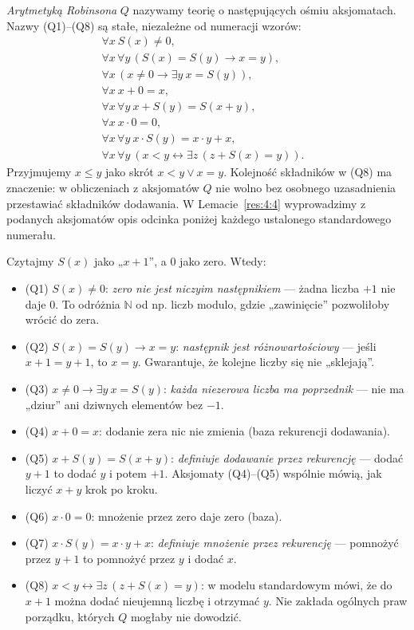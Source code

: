 \begin{definicja}\label{res:4:1}
\emph{Arytmetyką Robinsona} $Q$ nazywamy teorię o następujących ośmiu aksjomatach. Nazwy (Q1)--(Q8) są stałe, niezależne od numeracji wzorów:
\begin{align*}
\forall x\ S(x)\ne0, &\tag{Q1}\\
\forall x\,\forall y\,(S(x)=S(y)\to x=y), &\tag{Q2}\\
\forall x\,(x\ne0\to\exists y\ x=S(y)), &\tag{Q3}\\
\forall x\ x+0=x, &\tag{Q4}\\
\forall x\,\forall y\ x+S(y)=S(x+y), &\tag{Q5}\\
\forall x\ x\cdot0=0, &\tag{Q6}\\
\forall x\,\forall y\ x\cdot S(y)=x\cdot y+x, &\tag{Q7}\\
\forall x\,\forall y\ (x<y\leftrightarrow\exists z\,(z+S(x)=y)). &\tag{Q8}
\end{align*}
Przyjmujemy $x\le y$ jako skrót $x<y\lor x=y$. Kolejność składników w (Q8) ma znaczenie: w obliczeniach z aksjomatów $Q$ nie wolno bez osobnego uzasadnienia przestawiać składników dodawania. W Lemacie~\ref{res:4:4} wyprowadzimy z podanych aksjomatów opis odcinka poniżej każdego ustalonego standardowego numerału.
\end{definicja}

\begin{uwaga}\label{res:4:2}
Czytajmy $S(x)$ jako „$x+1$”, a $0$ jako zero. Wtedy:
\begin{itemize}
\item \textup{(Q1)} $S(x)\ne0$: \emph{zero nie jest niczyim następnikiem} --- żadna liczba $+1$ nie daje $0$. To odróżnia $\mathbb N$ od np. liczb modulo, gdzie „zawinięcie” pozwoliłoby wrócić do zera.
\item \textup{(Q2)} $S(x)=S(y)\to x=y$: \emph{następnik jest różnowartościowy} --- jeśli $x+1=y+1$, to $x=y$. Gwarantuje, że kolejne liczby się nie „sklejają”.
\item \textup{(Q3)} $x\ne0\to\exists y\ x=S(y)$: \emph{każda niezerowa liczba ma poprzednik} --- nie ma „dziur” ani dziwnych elementów bez $-1$.
\item \textup{(Q4)} $x+0=x$: dodanie zera nic nie zmienia (baza rekurencji dodawania).
\item \textup{(Q5)} $x+S(y)=S(x+y)$: \emph{definiuje dodawanie przez rekurencję} --- dodać $y+1$ to dodać $y$ i potem $+1$. Aksjomaty (Q4)--(Q5) wspólnie mówią, jak liczyć $x+y$ krok po kroku.
\item \textup{(Q6)} $x\cdot0=0$: mnożenie przez zero daje zero (baza).
\item \textup{(Q7)} $x\cdot S(y)=x\cdot y+x$: \emph{definiuje mnożenie przez rekurencję} --- pomnożyć przez $y+1$ to pomnożyć przez $y$ i dodać $x$.
\item \textup{(Q8)} $x<y\leftrightarrow\exists z\,(z+S(x)=y)$: w modelu standardowym mówi, że do $x+1$ można dodać nieujemną liczbę i otrzymać $y$. Nie zakłada ogólnych praw porządku, których $Q$ mogłaby nie dowodzić.
\end{itemize}
\end{uwaga}

